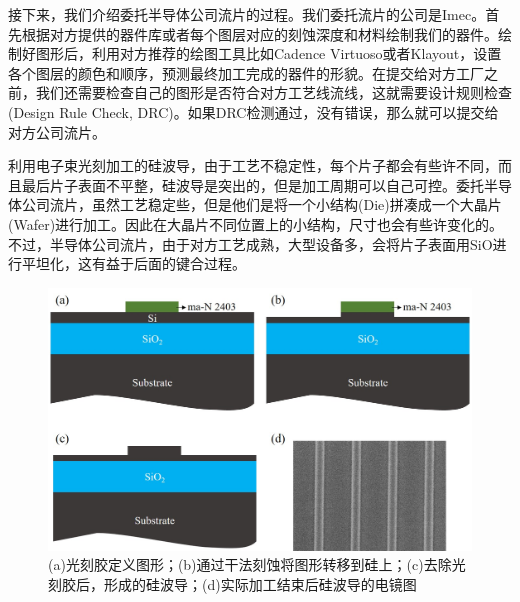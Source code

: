 接下来，我们介绍委托半导体公司流片的过程。我们委托流片的公司是Imec\cite{Imec}。首先根据对方提供的器件库或者每个图层对应的刻蚀深度和材料绘制我们的器件。绘制好图形后，利用对方推荐的绘图工具比如Cadence Virtuoso或者Klayout，设置各个图层的颜色和顺序，预测最终加工完成的器件的形貌。在提交给对方工厂之前，我们还需要检查自己的图形是否符合对方工艺线流线，这就需要设计规则检查(Design Rule Check, DRC)。如果DRC检测通过，没有错误，那么就可以提交给对方公司流片。

利用电子束光刻加工的硅波导，由于工艺不稳定性，每个片子都会有些许不同，而且最后片子表面不平整，硅波导是突出的，但是加工周期可以自己可控。委托半导体公司流片，虽然工艺稳定些，但是他们是将一个小结构(Die)拼凑成一个大晶片(Wafer)进行加工。因此在大晶片不同位置上的小结构，尺寸也会有些许变化的。不过，半导体公司流片，由于对方工艺成熟，大型设备多，会将片子表面用SiO进行平坦化，这有益于后面的键合过程。

\begin{figure}[htb]
	\centering
	\includegraphics[width=14cm]{./Pictures/chapt4_3D_etch_siwg.jpg}
	\caption{(a)光刻胶定义图形；(b)通过干法刻蚀将图形转移到硅上；(c)去除光刻胶后，形成的硅波导；(d)实际加工结束后硅波导的电镜图}
	\label{chapt4_3D_etch_siwg}
\end{figure}

